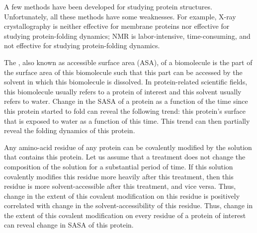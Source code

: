 A few methods have been developed for studying protein structures. 
Unfortunately, all these methods have some weaknesses.
For example, X-ray crystallography is neither effective for membrane proteins nor effective for studying protein-folding dynamics;
	NMR is labor-intensive, time-consuming, and not effective for studying protein-folding dynamics.  

The , also known as accessible surface area (ASA), of a biomolecule is the part of the surface area of this biomolecule such that this part can be accessed by the solvent in which this biomolecule is dissolved.{}
In protein-related scientific fields, this biomolecule usually refers to a protein of interest and this solvent usually refers to water.
Change in the	\gls{SASA} of a protein as a function of the time since this protein started to fold can reveal the following trend:
	this protein's surface that is exposed to water as a function of this time.
This trend can then partially reveal the folding dynamics of this protein.
		
Any amino-acid residue of any protein can be covalently modified by the solution that contains this protein.	
Let us assume that a treatment does not change the composition of the solution for a substantial period of time.
If this solution covalently modifies this residue more heavily after this treatment, then this residue is more solvent-accessible after this treatment, and vice versa.
Thus, change in the extent of this covalent modification on this residue is positively correlated with change in the solvent-accessibility of this residue.
Thus, change in the extent of this covalent modification on every residue of a protein of interest can reveal change in \gls{SASA} of this protein. 
		
